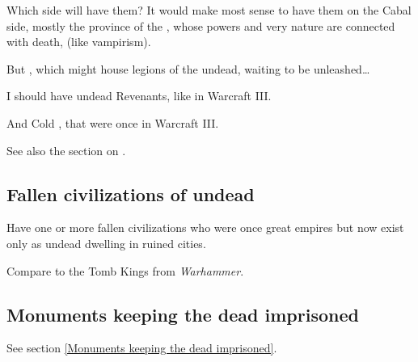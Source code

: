 Which side will have them? It would make most sense to have them on the Cabal side, mostly the province of the \banes, whose powers and very nature are connected with death,  (like vampirism). 

But , which might house legions of the undead, waiting to be unleashed\ldots{}

I should have undead Revenants, like in Warcraft III. 

And Cold , that were once in Warcraft III. 

See also the section on .








\subsection{Fallen civilizations of undead}
Have one or more fallen civilizations who were once great empires but now exist only as undead dwelling in ruined cities. 

Compare to the Tomb Kings from \emph{Warhammer}. 







\subsection{Monuments keeping the dead imprisoned}
See section \ref{Monuments keeping the dead imprisoned}.









